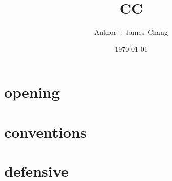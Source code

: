 

\title{CC}
\author{ {\Biohazard} \hspace{1.5mm} \hspace{1.5mm} Author\ :\ James\ Chang}
\date{\today}


\large

\tableofcontents

\chapter{opening}





\chapter{conventions}




\chapter{defensive}






